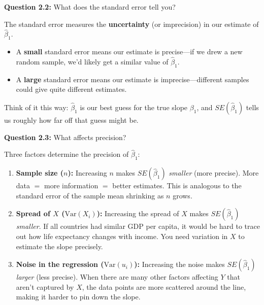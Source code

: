 \documentclass[11pt,letterpaper]{article}
\begin{document}
\textbf{Question 2.2:} What does the standard error tell you?

\begin{answer}
The standard error measures the \textbf{uncertainty} (or imprecision) in our estimate of $\hat{\beta}_1$.

\begin{itemize}[noitemsep]
\item A \textbf{small} standard error means our estimate is precise---if we drew a new random sample, we'd likely get a similar value of $\hat{\beta}_1$.
\item A \textbf{large} standard error means our estimate is imprecise---different samples could give quite different estimates.
\end{itemize}

Think of it this way: $\hat{\beta}_1$ is our best guess for the true slope $\beta_1$, and $SE(\hat{\beta}_1)$ tells us roughly how far off that guess might be.
\end{answer}

\textbf{Question 2.3:} What affects precision?

\begin{answer}
Three factors determine the precision of $\hat{\beta}_1$:

\begin{enumerate}[noitemsep]
\item \textbf{Sample size ($n$):} Increasing $n$ makes $SE(\hat{\beta}_1)$ \textit{smaller} (more precise). More data $=$ more information $=$ better estimates. This is analogous to the standard error of the sample mean shrinking as $n$ grows.

\item \textbf{Spread of $X$ ($\text{Var}(X_i)$):} Increasing the spread of $X$ makes $SE(\hat{\beta}_1)$ \textit{smaller}. If all countries had similar GDP per capita, it would be hard to trace out how life expectancy changes with income. You need variation in $X$ to estimate the slope precisely.

\item \textbf{Noise in the regression ($\text{Var}(u_i)$):} Increasing the noise makes $SE(\hat{\beta}_1)$ \textit{larger} (less precise). When there are many other factors affecting $Y$ that aren't captured by $X$, the data points are more scattered around the line, making it harder to pin down the slope.
\end{enumerate}
\end{answer}

\newpage
\end{document}
